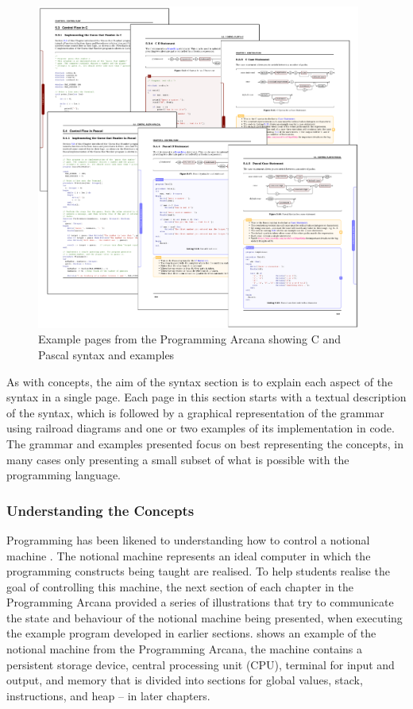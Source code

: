 \begin{figure}[h]
  \centering
  \includegraphics[width=0.95\textwidth]{ArcanaSyntax}
  \caption{Example pages from the Programming Arcana showing C and Pascal syntax and examples}
  \label{fig:arcana_syntax}
\end{figure}

As with concepts, the aim of the syntax section is to explain each aspect of the syntax in a single page. Each page in this section starts with a textual description of the syntax, which is followed by a graphical representation of the grammar using railroad diagrams and one or two examples of its implementation in code. The grammar and examples presented focus on best representing the concepts, in many cases only presenting a small subset of what is possible with the programming language. 


\subsubsection{Understanding the Concepts} %
\label{par:understanding_the_concepts_}

Programming has been likened to understanding how to control a notional machine \cite{DuBoulay:1986}. The notional machine represents an ideal computer in which the programming constructs being taught are realised. To help students realise the goal of controlling this machine, the next section of each chapter in the Programming Arcana provided a series of illustrations that try to communicate the state and behaviour of the notional machine being presented, when executing the example program developed in earlier sections.  shows an example of the notional machine from the Programming Arcana, the machine contains a persistent storage device, central processing unit (CPU), terminal for input and output, and memory that is divided into sections for global values, stack, instructions, and heap -- in later chapters. 

